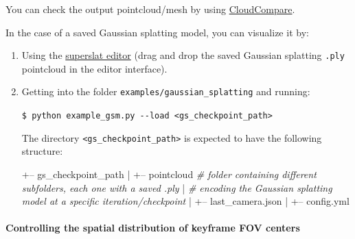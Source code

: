 \documentclass{article}
\newenvironment{Shaded}{\begin{snugshade}}{\end{snugshade}}
\newcommand{\BuiltInTok}[1]{\textcolor[rgb]{0.74,0.68,0.62}{#1}}
\newcommand{\ExtensionTok}[1]{\textcolor[rgb]{0.74,0.68,0.62}{#1}}
\newcommand{\NormalTok}[1]{\textcolor[rgb]{0.74,0.68,0.62}{#1}}
\let\oldparagraph\paragraph
\renewcommand{\paragraph}[1]{\oldparagraph{#1}\mbox{}}
\newcommand{\codeline}[1]{\texttt{\NormalTok{\$ }\BuiltInTok{\ExtensionTok{#1}}}}
\newenvironment{codeblock}
{
\begin{scriptsize}
\begin{Shaded}
}
{
\end{Shaded}
\end{scriptsize}
}
\begin{document}
You can check the output pointcloud/mesh by using
\href{https://www.cloudcompare.org/}{CloudCompare}.

In the case of a saved Gaussian splatting model, you can visualize it
by: 
\begin{enumerate}
\item Using the
\href{https://playcanvas.com/supersplat/editor}{superslat editor} (drag
and drop the saved Gaussian splatting \texttt{.ply} pointcloud in the
editor interface). 

\item Getting into the folder
\texttt{examples/gaussian\_splatting} and running:\\
\begin{codeblock}
\codeline{python\ example\_gsm.py\ -\/-load\ \textless{}gs\_checkpoint\_path\textgreater{}}
\end{codeblock}

The directory \texttt{<gs\_checkpoint\_path>} is expected to have the following structure:\\
\begin{scriptsize}
\begin{Shaded}
\begin{Highlighting}[]
\NormalTok{+-- gs_checkpoint_path}
\NormalTok{|   +-- pointcloud         \textit{# folder containing different subfolders, each one with a saved .ply}}
\NormalTok{|                          \textit{# encoding the Gaussian splatting model at a specific iteration/checkpoint}}
\NormalTok{|   +-- last_camera.json}
\NormalTok{|   +-- config.yml}
\end{Highlighting}
\end{Shaded}
\end{scriptsize}

\end{enumerate}



\hypertarget{controlling-the-spatial-distribution-of-keyframe-fov-centers}{%
\paragraph{Controlling the spatial distribution of keyframe FOV
centers}\label{controlling-the-spatial-distribution-of-keyframe-fov-centers}}
\end{document}

